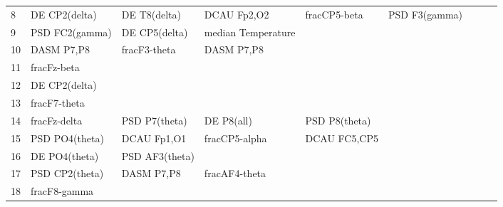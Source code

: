 \begin{landscape}
\begin{table}[]
\begin{tabular}{l|llllllll}
8                  & DE CP2(delta)        & DE T8(delta)            & DCAU Fp2,O2          & fracCP5-beta       & PSD F3(gamma)         &                      &                 &                 \\
9                  & PSD FC2(gamma)       & DE CP5(delta)           & median Temperature   &                    &                       &                      &                 &                 \\
10                 & DASM P7,P8           & fracF3-theta            & DASM P7,P8           &                    &                       &                      &                 &                 \\
11                 & fracFz-beta          &                         &                      &                    &                       &                      &                 &                 \\
12                 & DE CP2(delta)        &                         &                      &                    &                       &                      &                 &                 \\
13                 & fracF7-theta         &                         &                      &                    &                       &                      &                 &                 \\
14                 & fracFz-delta         & PSD P7(theta)           & DE P8(all)           & PSD P8(theta)      &                       &                      &                 &                 \\
15                 & PSD PO4(theta)       & DCAU Fp1,O1             & fracCP5-alpha        & DCAU FC5,CP5       &                       &                      &                 &                 \\
16                 & DE PO4(theta)        & PSD AF3(theta)          &                      &                    &                       &                      &                 &                 \\
17                 & PSD CP2(theta)       & DASM P7,P8              & fracAF4-theta        &                    &                       &                      &                 &                 \\
18                 & fracF8-gamma         &                         &                      &                    &                       &                      &                 &                 \\

\end{tabular}
\end{table}
\end{landscape}
